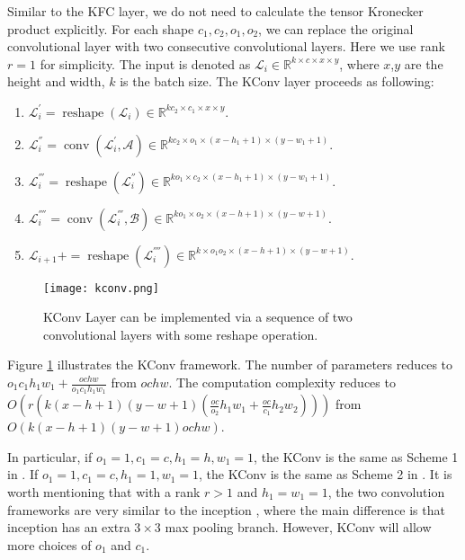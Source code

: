 \documentclass{article}
\def\RB{{\mathbb R}}
\def\reshape{\operatorname{reshape}}
\def\conv{\operatorname{conv}}
\begin{document}
Similar to the KFC layer, we do not need to calculate the tensor Kronecker product explicitly. For each shape $c_1,c_2,o_1,o_2$, we can replace the
original convolutional layer with two consecutive convolutional layers. Here we use rank $r=1$ for simplicity. The input is denoted as $\mathcal{L}_i \in \RB^{k\times c\times x \times y}$, where $x$,$y$ are the height and width, $k$ is the batch size. The KConv layer proceeds as following:
\begin{enumerate}
\item $\mathcal{L}_i^{'} = \reshape(\mathcal{L}_i) \in \RB^{kc_2\times c_1\times x \times y}$.
\item $\mathcal{L}_i^{''} = \conv(\mathcal{L}_i^{'}, \mathcal{A}) \in \RB^{kc_2\times o_1\times (x-h_1+1) \times (y-w_1+1)}$.
\item $\mathcal{L}_i^{'''} = \reshape(\mathcal{L}_i^{''}) \in \RB^{ko_1\times c_2\times (x-h_1+1) \times (y-w_1+1)}$.
\item $ \mathcal{L}_i^{''''} = \conv(\mathcal{L}_i^{'''}, \mathcal{B}) \in \RB^{ko_1\times o_2\times (x-h+1) \times (y-w+1)}$.
\item $ \mathcal{L}_{i+1} \mathrel{{+}{=}} \reshape({\mathcal{L}_i^{''''}}) \in \RB^{k\times o_1o_2\times (x-h+1) \times (y-w+1)}$.
\end{enumerate}
\begin{figure}
\centering
\texttt{[image: kconv.png]}
\caption{KConv Layer can be implemented via a sequence of two convolutional layers with some reshape operation.}
\label{fig:kconv}
\end{figure}

Figure \ref{fig:kconv} illustrates the KConv framework. The number of parameters reduces to $o_1c_1h_1w_1+\frac{ochw}{o_1c_1h_1w_1}$ from $ochw$. The computation complexity reduces to $O(r(k(x-h+1)(y-w+1)(\frac{oc}{o_2}h_1w_1+\frac{oc}{c_1}h_2w_2)))$ from $O(k(x-h+1)(y-w+1)ochw)$.


In particular, if $o_1=1, c_1=c, h_1=h, w_1=1$, the KConv is the same as  Scheme 1 in \cite{DBLP:conf/bmvc/JaderbergVZ14}.
If $o_1=1, c_1=c, h_1=1, w_1=1$, the KConv is the same as Scheme 2 in \cite{DBLP:conf/bmvc/JaderbergVZ14}.
It is worth mentioning that with a rank $ r>1$ and $h_1=w_1=1$, the two convolution frameworks are very similar to the inception
\cite{szegedy2014going}, where the main difference is that inception has an extra $3\times 3$ max pooling branch.
However, KConv will allow more choices of $o_1$ and $c_1$.
\end{document}

